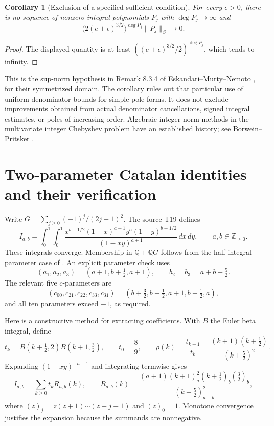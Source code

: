 \documentclass[11pt,a4paper]{article}
\newtheorem{corollary}[theorem]{Corollary}
\theoremstyle{definition}\newtheorem{definition}[theorem]{Definition}
\theoremstyle{remark}\newtheorem{remark}[theorem]{Remark}
\newcommand{\Q}{\mathbb Q}\newcommand{\Z}{\mathbb Z}\newcommand{\N}{\mathbb N}\newcommand{\R}{\mathbb R}\newcommand{\C}{\mathbb C}
\begin{document}
\begin{corollary}[Exclusion of a specified sufficient condition]\label{cor:barrier}
For every $\epsilon>0$, there is no sequence of nonzero integral polynomials $P_j$ with $\deg P_j\to\infty$ and
\[
 \bigl(2(e+\epsilon)^{3/2}\bigr)^{\deg P_j}\|P_j\|_S\longrightarrow0.
\]
\end{corollary}
\begin{proof}
The displayed quantity is at least
$((e+\epsilon)^{3/2}/2)^{\deg P_j}$, which tends to infinity.
\end{proof}

This is the sup-norm hypothesis in Remark 8.3.4 of Eskandari--Murty--Nemoto \cite{EMN}, for their symmetrized domain. The corollary rules out that particular use of uniform denominator bounds for simple-pole forms. It does not exclude improvements obtained from actual denominator cancellations, signed integral estimates, or poles of increasing order. Algebraic-integer norm methods in the multivariate integer Chebyshev problem have an established history; see Borwein--Pritsker \cite{BP}.

\appendix
\section{Two-parameter Catalan identities and their verification}\label{sec:two}
Write $G=\sum_{j\ge0}(-1)^j/(2j+1)^2$. The source T19 defines
\begin{equation}\label{eq:Iab}
 I_{a,b}=\int_0^1\!\int_0^1
 \frac{x^{b-1/2}(1-x)^{a+1}y^a(1-y)^{b+1/2}}{(1-xy)^{a+1}}\,dx\,dy,
 \qquad a,b\in\Z_{\ge0}.
\end{equation}
These integrals converge. Membership in $\Q+\Q G$ follows from the half-integral parameter case of \cite[Theorem 3]{Z02}. An explicit parameter check uses
\[
 (a_1,a_2,a_3)=(a+1,b+\tfrac12,a+1),\qquad
 b_2=b_3=a+b+\tfrac52.
\]
The relevant five $c$-parameters are
\[
 (c_{00},c_{21},c_{22},c_{33},c_{31})
 =(b+\tfrac32,b-\tfrac12,a+1,b+\tfrac12,a),
\]
and all ten parameters exceed $-1$, as required.

Here is a constructive method for extracting coefficients. With $B$ the Euler beta integral, define
\[
 t_k=B(k+\tfrac12,2)B(k+1,\tfrac32),\qquad t_0=\frac89,
 \qquad \rho(k)=\frac{t_{k+1}}{t_k}
 =\frac{(k+1)(k+\tfrac12)}{(k+\tfrac52)^2}.
\]
Expanding $(1-xy)^{-a-1}$ and integrating termwise gives
\[
 I_{a,b}=\sum_{k\ge0}t_kR_{a,b}(k),\qquad
 R_{a,b}(k)=
 \frac{(a+1)(k+1)_a^2(k+\tfrac12)_b(\tfrac32)_b}
 {(k+\tfrac52)_{a+b}^2},
\]
where $(z)_j=z(z+1)\cdots(z+j-1)$ and $(z)_0=1$. Monotone convergence justifies the expansion because the summands are nonnegative.
\end{document}
